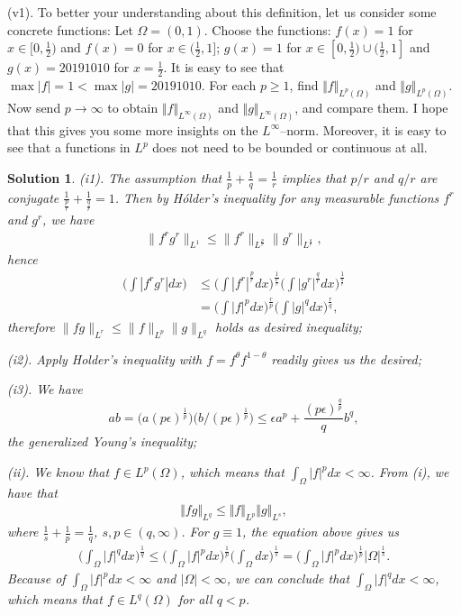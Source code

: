 \documentclass[6pt]{article}
\newtheorem{solution}{Solution}
\numberwithin{equation}{section}
\def\dfrac#1#2{\frac{\displaystyle {#1}}{\displaystyle {#2}}}
\begin{document}
\begin{enumerate}
(v1).  To better your understanding about this definition, let us consider some concrete functions: Let $\Omega=(0,1)$.  Choose the functions: $f(x)=1$ for $x\in[0,\frac{1}{2})$ and $f(x)=0$ for $x\in(\frac{1}{2},1]$; $g(x)=1$ for $x\in[0,\frac{1}{2})\cup(\frac{1}{2},1]$ and $g(x)=20191010$ for $x=\frac{1}{2}$.  It is easy to see that $\max|f|=1<\max|g|=20191010$.  For each $p\geq1$, find $\Vert f\Vert_{L^p(\Omega)}$ and $\Vert g\Vert_{L^p(\Omega)}$.  Now send $p\rightarrow\infty$ to obtain $\Vert f\Vert_{L^\infty(\Omega)}$ and $\Vert g\Vert_{L^\infty(\Omega)}$, and compare them.  I hope that this gives you some more insights on the $L^\infty$--norm.  Moreover, it is easy to see that a functions in $L^p$ does not need to be bounded or continuous at all.
\begin{solution}
(i1).   The assumption that $\dfrac{1}{p}+\dfrac{1}{q}=\dfrac{1}{r}$ implies that $p/r$ and $q/r$ are conjugate $\dfrac{1}{\frac{p}{r}}+\dfrac{1}{\frac{q}{r}}=1$.   Then by H\'older's inequality for any measurable functions $f^{r}$ and $g^{r}$, we have
  \begin{align}
  \|f^{r}g^{r}\|_{L^{1}}\leqslant \|f^{r}\|_{L^{\frac{p}{r}}}\|g^{r}\|_{L^{\frac{q}{r}}},
  \end{align}
hence
  \begin{align}
  \Big(\int{|f^{r}g^{r}|dx} \Big)&\leqslant  \Big(\int{|f^{r}|^{\frac{p}{r}}dx} \Big)^{\frac{1}{\frac{p}{r}}} \Big(\int{|g^{r}|^{\frac{q}{r}}dx} \Big)^{\frac{1}{\frac{q}{r}}} \nonumber \\
  &= \Big(\int{|f|^{p}dx} \Big)^{\frac{r}{p}} \Big(\int{|g|^{q}dx} \Big)^{\frac{r}{q}},
  \end{align}
therefore $\|fg\|_{L^{r}}\leq \|f\|_{L^{p}}\|g\|_{L^{q}}$ holds as desired inequality;

(i2).  Apply Holder's inequality with $f=f^\theta f^{1-\theta}$ readily gives us the desired;

(i3).  We have
\[ab=\Big(a(p\epsilon)^\frac{1}{p} \Big)\Big(b/(p\epsilon)^\frac{1}{p} \Big)\leq \epsilon a^p+\frac{(p\epsilon)^\frac{q}{p}}{q}b^q,\]
the generalized Young's inequality;

(ii). We know that $f\in L^p(\Omega)$, which means that $\int_\Omega \vert f \vert^p dx<\infty$. From (i), we have that
\begin{align*}
\Vert fg\Vert_{L^{q}}\leqslant\Vert f\Vert_{L^p}\Vert g\Vert_{L^s},
\end{align*}
where $\frac{1}{s}+\frac{1}{p}=\frac{1}{q}$, $s,p\in(q,\infty)$.  For $g \equiv 1$, the equation above gives us
\begin{align*}
\Big(\int_{\Omega}\vert f\vert^{q}dx\Big)^{\frac{1}{q}}\leqslant\Big(\int_{\Omega}\vert f\vert^{p}dx\Big)^{\frac{1}{p}}\Big(\int_{\Omega}dx\Big)^{\frac{1}{s}}=\Big(\int_{\Omega}\vert f\vert^{p}dx\Big)^{\frac{1}{p}}\vert\Omega\vert^{\frac{1}{s}}.
\end{align*}
Because of  $\int_\Omega \vert f \vert^p dx<\infty$ and $\vert\Omega\vert<\infty$, we can conclude that $\int_{\Omega}\vert f\vert^{q}dx<\infty$, which means that $f\in L^q(\Omega)$ for all $q<p$.


\end{solution}
\end{enumerate}
\end{document}

